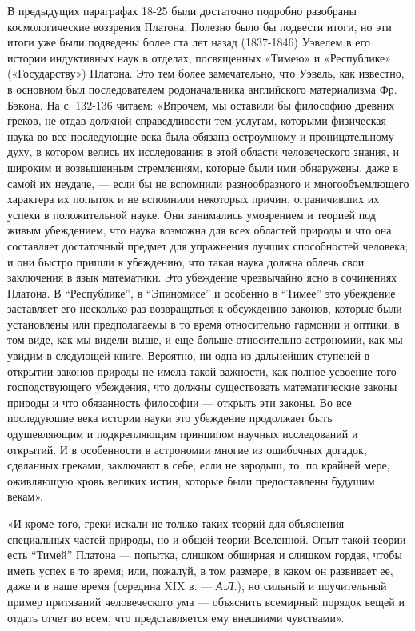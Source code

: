 В предыдущих параграфах 18-25 были достаточно подробно разобраны
космологические воззрения Платона. Полезно было бы подвести итоги, но
эти итоги уже были подведены более ста лет назад (1837-1846) Уэвелем в
его истории индуктивных наук в отделах, посвященных «Тимею» и
«Республике» («Государству») Платона. Это тем более замечательно, что
Уэвель, как известно, в основном был последователем родоначальника
английского материализма Фр. Бэкона. На с. 132-136 читаем: «Впрочем,
мы оставили бы философию древних греков, не отдав должной
справедливости тем услугам, которыми физическая наука во все
последующие века была обязана остроумному и проницательному духу, в
котором велись их исследования в этой области человеческого знания, и
широким и возвышенным стремлениям, которые были ими обнаружены, даже
в самой их неудаче, --- если бы не вспомнили разнообразного и
многообъемлющего характера их попыток и не вспомнили некоторых причин,
ограничивших их успехи в положительной науке. Они занимались
умозрением и теорией под живым убеждением, что наука возможна для всех
областей природы и что она составляет достаточный предмет для
упражнения лучших способностей человека; и они быстро пришли к
убеждению, что такая наука должна облечь свои заключения в язык
математики. Это убеждение чрезвычайно ясно в сочинениях Платона. В
``Республике'', в ``Эпиномисе'' и особенно в ``Тимее'' это убеждение
заставляет его несколько раз возвращаться к обсуждению законов,
которые были установлены или предполагаемы в то время относительно
гармонии и оптики, в том виде, как мы видели выше, и еще больше
относительно астрономии, как мы увидим в следующей книге. Вероятно, ни
одна из дальнейших ступеней в открытии законов природы не имела такой
важности, как полное усвоение того господствующего убеждения, что
должны существовать математические законы природы и что обязанность
философии --- открыть эти законы. Во все последующие века истории
науки это убеждение продолжает быть одушевляющим и подкрепляющим
принципом научных исследований и открытий. И в особенности в
астрономии многие из ошибочных догадок, сделанных греками, заключают в
себе, если не зародыш, то, по крайней мере, оживляющую кровь великих
истин, которые были предоставлены будущим векам».

«И кроме того, греки искали не только таких теорий для объяснения
специальных частей природы, но и общей теории Вселенной. Опыт такой
теории есть ``Тимей'' Платона --- попытка, слишком обширная и слишком
гордая, чтобы иметь успех в то время; или, пожалуй, в том размере, в
каком он развивает ее, даже и в наше время (середина XIX в. ---
\emph{А.Л.}), но сильный и поучительный пример притязаний
человеческого ума --- объяснить всемирный порядок вещей и отдать отчет
во всем, что представляется ему внешними чувствами».

